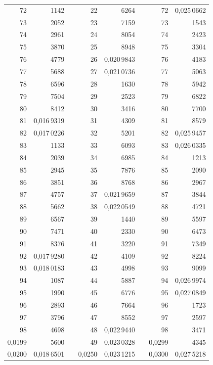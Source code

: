 \begin{tabular}{|r|r|@{}p{9pt}@{}|r|r|@{}p{9pt}@{}|r|r|}
72 & 1142 &  & 22 & 6264 &  & 72 & 0,025\,0662 \\
73 & 2052 &  & 23 & 7159 &  & 73 & 1543 \\
74 & 2961 &  & 24 & 8054 &  & 74 & 2423 \\
75 & 3870 &  & 25 & 8948 &  & 75 & 3304 \\[3pt]
76 & 4779 &  & 26 & 0,020\,9843 &  & 76 & 4183 \\
77 & 5688 &  & 27 & 0,021\,0736 &  & 77 & 5063 \\
78 & 6596 &  & 28 & 1630 &  & 78 & 5942 \\
79 & 7504 &  & 29 & 2523 &  & 79 & 6822 \\
80 & 8412 &  & 30 & 3416 &  & 80 & 7700 \\[3pt]
81 & 0,016\,9319 &  & 31 & 4309 &  & 81 & 8579 \\
82 & 0,017\,0226 &  & 32 & 5201 &  & 82 & 0,025\,9457 \\
83 & 1133 &  & 33 & 6093 &  & 83 & 0,026\,0335 \\
84 & 2039 &  & 34 & 6985 &  & 84 & 1213 \\
85 & 2945 &  & 35 & 7876 &  & 85 & 2090 \\[3pt]
86 & 3851 &  & 36 & 8768 &  & 86 & 2967 \\
87 & 4757 &  & 37 & 0,021\,9659 &  & 87 & 3844 \\
88 & 5662 &  & 38 & 0,022\,0549 &  & 88 & 4721 \\
89 & 6567 &  & 39 & 1440 &  & 89 & 5597 \\
90 & 7471 &  & 40 & 2330 &  & 90 & 6473 \\[3pt]
91 & 8376 &  & 41 & 3220 &  & 91 & 7349 \\
92 & 0,017\,9280 &  & 42 & 4109 &  & 92 & 8224 \\
93 & 0,018\,0183 &  & 43 & 4998 &  & 93 & 9099 \\
94 & 1087 &  & 44 & 5887 &  & 94 & 0,026\,9974 \\
95 & 1990 &  & 45 & 6776 &  & 95 & 0,027\,0849 \\[3pt]
96 & 2893 &  & 46 & 7664 &  & 96 & 1723 \\
97 & 3796 &  & 47 & 8552 &  & 97 & 2597 \\
98 & 4698 &  & 48 & 0,022\,9440 &  & 98 & 3471 \\
0,0199 & 5600 &  & 49 & 0,023\,0328 &  & 0,0299 & 4345 \\
0,0200 & 0,018\,6501 &  & 0,0250 & 0,023\,1215 &  & 0,0300 & 0,027\,5218 \\
\hline
\end{tabular}\par
